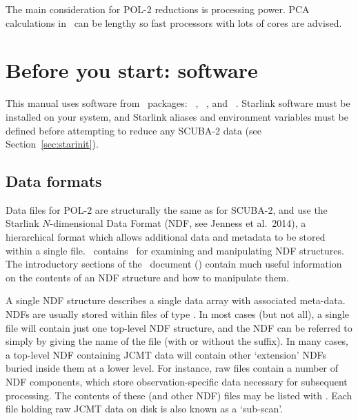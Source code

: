 The main consideration for POL-2 reductions is processing power. PCA calculations in
\makemap\ can be lengthy so fast processors with lots of cores are advised.


\section{Before you start: software}

This manual uses software from \starlink\ packages: \smurf\
\cite{smurf}, \Kappa\ \cite{kappa}, \polpack \cite{polpack} and \gaia\ \cite{gaia}.
Starlink software must be installed on your system, and Starlink
aliases and environment variables must be defined before attempting
to reduce any SCUBA-2 data (see Section~\ref{sec:starinit}).


\subsection{Data formats}
\label{sec:ndf}

Data files for POL-2 are structurally the same as for SCUBA-2, and use
the Starlink $N$-dimensional Data Format (NDF,
see Jenness et al.\ 2014\cite{ndf}), a hierarchical format which allows
additional data and metadata to be stored within a single file. \Kappa\
contains \ for examining and
manipulating NDF structures. The introductory sections of the \Kappa\
document () contain much useful information on
the contents of an NDF structure and how to manipulate them.

A single NDF structure describes a single data array with associated
meta-data. NDFs are usually stored within files of type .
In most cases (but not all), a single  file will contain just
one top-level NDF structure, and the NDF can be referred to simply by
giving the name of the file (with or without the \file{.sdf} suffix).
In many cases, a top-level NDF containing JCMT data will contain other
`extension' NDFs buried inside them at a lower level. For instance, raw
files contain a number of NDF components, which store observation-specific
data necessary for subsequent processing. The contents of these (and
other NDF) files may be listed with \HDSTRACEref. Each file holding raw
JCMT data on disk is also known as a `sub-scan'.

